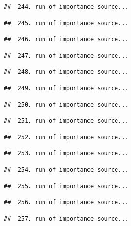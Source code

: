 \documentclass[
]{article}
\begin{document}
\begin{verbatim}
##  244. run of importance source...
\end{verbatim}

\begin{verbatim}
##  245. run of importance source...
\end{verbatim}

\begin{verbatim}
##  246. run of importance source...
\end{verbatim}

\begin{verbatim}
##  247. run of importance source...
\end{verbatim}

\begin{verbatim}
##  248. run of importance source...
\end{verbatim}

\begin{verbatim}
##  249. run of importance source...
\end{verbatim}

\begin{verbatim}
##  250. run of importance source...
\end{verbatim}

\begin{verbatim}
##  251. run of importance source...
\end{verbatim}

\begin{verbatim}
##  252. run of importance source...
\end{verbatim}

\begin{verbatim}
##  253. run of importance source...
\end{verbatim}

\begin{verbatim}
##  254. run of importance source...
\end{verbatim}

\begin{verbatim}
##  255. run of importance source...
\end{verbatim}

\begin{verbatim}
##  256. run of importance source...
\end{verbatim}

\begin{verbatim}
##  257. run of importance source...
\end{verbatim}
\end{document}
